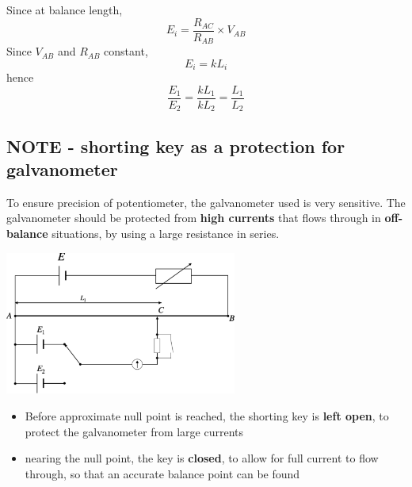 \documentclass[a4paper, 10pt]{article}
\begin{document}
Since at balance length, 
\[
   E_i = \frac{R_{AC}}{R_{AB}} \times V_{AB}
\]
Since $V_{AB}$ and $R_{AB}$ constant, 
\[
E_i =  k L_i
\]
hence 
\[
\frac{E_1}{E_2} = \frac{kL_1}{kL_2} = \frac{L_1}{L_2}
\]

\subsection*{NOTE - shorting key as a protection for galvanometer}

To ensure precision of potentiometer, the galvanometer used is very sensitive. The galvanometer should be protected from \textbf{high currents} that flows through in \textbf{off-balance} situations, by using a large resistance in series. 

\begin{center}
   \includegraphics[width=3in]{figures/5.pdf} 
\end{center}	

\begin{itemize}
   \item Before approximate null point is reached, the shorting key is \textbf{left open}, to protect the galvanometer from large currents
   \item nearing the null point, the key is \textbf{closed}, to allow for full current to flow through, so that an accurate balance point can be found
\end{itemize}	
\end{document}
